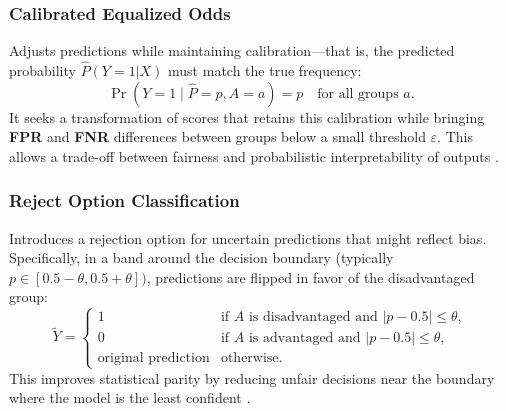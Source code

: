 \documentclass[12pt,a4paper,openright,twoside]{book}
\begin{document}
\subsubsection{Calibrated Equalized Odds} Adjusts predictions while maintaining calibration—that is, the predicted probability \begin{math}\hat{P}(Y=1|X)\end{math} must match the true frequency:
\begin{equation}
        \Pr(Y = 1 \mid \hat{P} = p, A = a) = p \quad\text{for all groups } a.
\end{equation}
It seeks a transformation of scores that retains this calibration while bringing \textbf{FPR} and \textbf{FNR} differences between groups below a small threshold \begin{math}\varepsilon\end{math}. This allows a trade-off between fairness and probabilistic interpretability of outputs \cite{NIPS2017_b8b9c74a}.

\subsubsection{Reject Option Classification} Introduces a rejection option for uncertain predictions that might reflect bias. Specifically, in a band around the decision boundary (typically \begin{math} p \in [0.5 - \theta, 0.5 + \theta]) \end{math}, predictions are flipped in favor of the disadvantaged group:
\begin{equation}
    \widetilde{Y} =
        \begin{cases}
        1 & \text{if } A \text{ is disadvantaged and } |p - 0.5| \le \theta, \\
        0 & \text{if } A \text{ is advantaged and } |p - 0.5| \le \theta, \\
        \text{original prediction} & \text{otherwise.}
        \end{cases}
\end{equation}
This improves statistical parity by reducing unfair decisions near the boundary where the model is the least confident \cite{6413831}.
\end{document}
